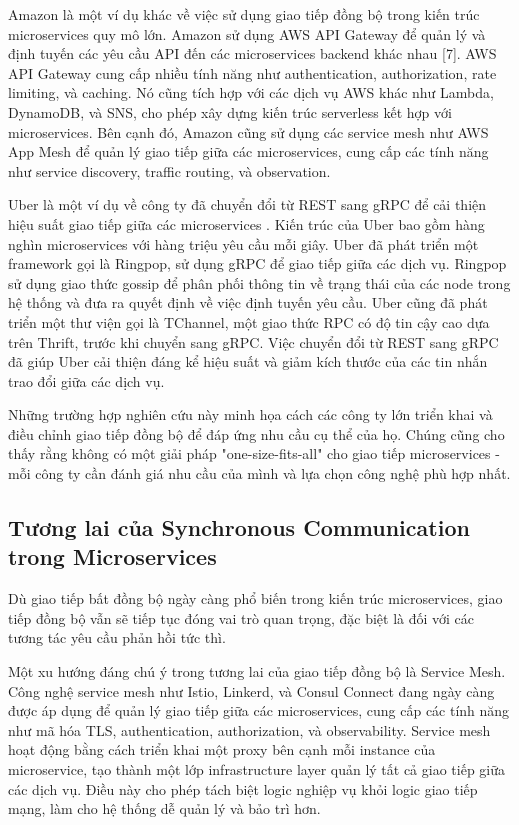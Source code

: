 Amazon là một ví dụ khác về việc sử dụng giao tiếp đồng bộ trong kiến trúc microservices quy mô lớn. Amazon sử dụng AWS API Gateway để quản lý và định tuyến các yêu cầu API đến các microservices backend khác nhau [7]. AWS API Gateway cung cấp nhiều tính năng như authentication, authorization, rate limiting, và caching. Nó cũng tích hợp với các dịch vụ AWS khác như Lambda, DynamoDB, và SNS, cho phép xây dựng kiến trúc serverless kết hợp với microservices. Bên cạnh đó, Amazon cũng sử dụng các service mesh như AWS App Mesh để quản lý giao tiếp giữa các microservices, cung cấp các tính năng như service discovery, traffic routing, và observation.

Uber là một ví dụ về công ty đã chuyển đổi từ REST sang gRPC để cải thiện hiệu suất giao tiếp giữa các microservices \cite{beyer2018}. Kiến trúc của Uber bao gồm hàng nghìn microservices với hàng triệu yêu cầu mỗi giây. Uber đã phát triển một framework gọi là Ringpop, sử dụng gRPC để giao tiếp giữa các dịch vụ. Ringpop sử dụng giao thức gossip để phân phối thông tin về trạng thái của các node trong hệ thống và đưa ra quyết định về việc định tuyến yêu cầu. Uber cũng đã phát triển một thư viện gọi là TChannel, một giao thức RPC có độ tin cậy cao dựa trên Thrift, trước khi chuyển sang gRPC. Việc chuyển đổi từ REST sang gRPC đã giúp Uber cải thiện đáng kể hiệu suất và giảm kích thước của các tin nhắn trao đổi giữa các dịch vụ.

Những trường hợp nghiên cứu này minh họa cách các công ty lớn triển khai và điều chỉnh giao tiếp đồng bộ để đáp ứng nhu cầu cụ thể của họ. Chúng cũng cho thấy rằng không có một giải pháp "one-size-fits-all" cho giao tiếp microservices - mỗi công ty cần đánh giá nhu cầu của mình và lựa chọn công nghệ phù hợp nhất.

\subsection{Tương lai của Synchronous Communication trong Microservices}
Dù giao tiếp bất đồng bộ ngày càng phổ biến trong kiến trúc microservices, giao tiếp đồng bộ vẫn sẽ tiếp tục đóng vai trò quan trọng, đặc biệt là đối với các tương tác yêu cầu phản hồi tức thì.

Một xu hướng đáng chú ý trong tương lai của giao tiếp đồng bộ là Service Mesh. Công nghệ service mesh như Istio, Linkerd, và Consul Connect đang ngày càng được áp dụng để quản lý giao tiếp giữa các microservices, cung cấp các tính năng như mã hóa TLS, authentication, authorization, và observability. Service mesh hoạt động bằng cách triển khai một proxy bên cạnh mỗi instance của microservice, tạo thành một lớp infrastructure layer quản lý tất cả giao tiếp giữa các dịch vụ. Điều này cho phép tách biệt logic nghiệp vụ khỏi logic giao tiếp mạng, làm cho hệ thống dễ quản lý và bảo trì hơn.

